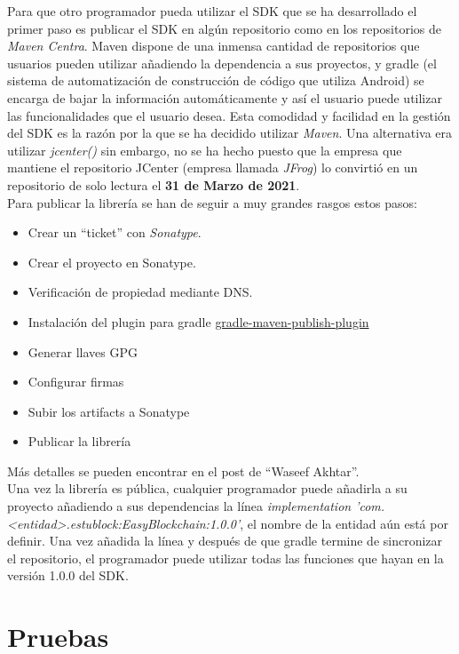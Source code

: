 Para que otro programador pueda utilizar el SDK que se ha desarrollado el primer paso es publicar el SDK en algún repositorio como en los repositorios de \emph{Maven Centra}\cite{maven}. Maven dispone de una inmensa cantidad de repositorios que usuarios pueden utilizar añadiendo la dependencia a sus proyectos, y gradle (el sistema de automatización de construcción de código que utiliza Android) se encarga de bajar la información automáticamente y así el usuario puede utilizar las funcionalidades que el usuario desea. Esta comodidad y facilidad en la gestión del SDK es la razón por la que se ha decidido utilizar \emph{Maven}. Una alternativa era utilizar \emph{jcenter()} sin embargo, no se ha hecho puesto que la empresa que mantiene el repositorio JCenter (empresa llamada \emph{JFrog}\cite{jfrog}) lo convirtió en un repositorio de solo lectura el \textbf{31 de Marzo de 2021}. \\

Para publicar la librería se han de seguir a muy grandes rasgos estos pasos:
\begin{itemize}
\item Crear un ``ticket'' con \emph{Sonatype}\cite{sonatype}.
\item Crear el proyecto en Sonatype.
\item Verificación de propiedad mediante DNS.
\item Instalación del plugin para gradle \href{https://github.com/vanniktech/gradle-maven-publish-plugin}{gradle-maven-publish-plugin}
\item Generar llaves GPG
\item Configurar firmas
\item Subir los artifacts a Sonatype
\item Publicar la librería
\end{itemize}

Más detalles se pueden encontrar en el post de ``Waseef Akhtar''\cite{waseef}. \\

Una vez la librería es pública, cualquier programador puede añadirla a su proyecto añadiendo a sus dependencias la línea \textit{implementation 'com.<entidad>.estublock:EasyBlockchain:1.0.0'}, el nombre de la entidad aún está por definir. Una vez añadida la línea y después de que gradle termine de sincronizar el repositorio, el programador puede utilizar todas las funciones que hayan en la versión 1.0.0 del SDK.


\section{Pruebas}

